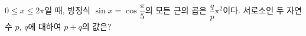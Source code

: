 $0\le x\le 2\pi$일 때, 방정식 $\sin x=\cos\dfrac{\pi}{5}$의 모든 근의 곱은 $\dfrac{q}{p}\pi^2$이다. 서로소인 두 자연수 $p$, $q$에 대하여 $p+q$의 값은?
